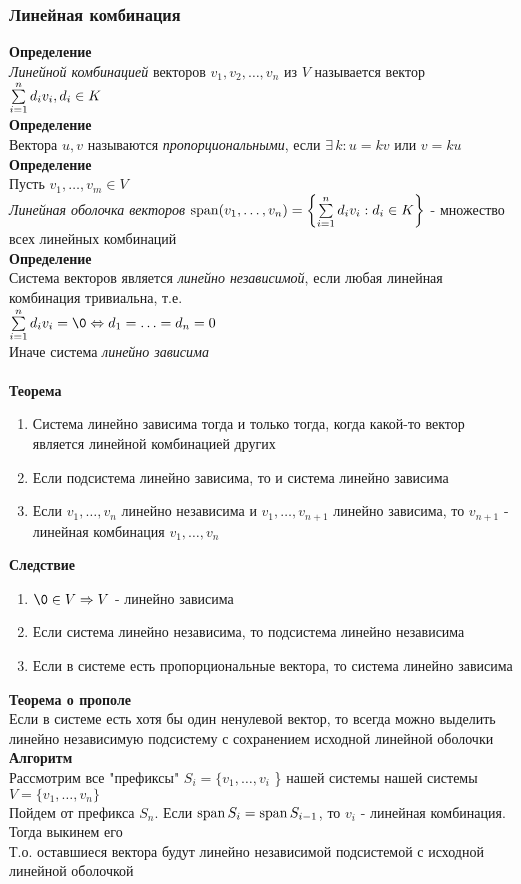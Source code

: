 \documentclass[12pt]{article}
\begin{document}
\subsubsection{Линейная комбинация}
\textbf{Определение}\\
\textit{Линейной комбинацией} векторов $v_1, v_2, \ldots, v_n$ из $V$ называется вектор $\sum\limits_{i=1}^n d_iv_i, d_i \in K$\\
\textbf{Определение}\\
Вектора $u,v$ называются \textit{пропорциональными}, если $\exists\,k: u = kv$ или $v = ku$\\
\textbf{Определение}\\
Пусть $v_1, \ldots, v_m \in V$\\
\textit{Линейная оболочка векторов} $\operatorname{span}(v_1,\ldots,v_n) = \left\{ \sum\limits_{i=1}^n d_iv_i: d_i \in K\right\}$ - множество всех линейных комбинаций\\
\textbf{Определение}\\
Система векторов является \textit{линейно независимой}, если любая линейная комбинация тривиальна, т.е.\\
$\suml_{i=1}^n d_iv_i = \0 \Leftrightarrow d_1 = \ldots = d_n = 0$\\
Иначе система \textit{линейно зависима}\\\\
\textbf{Теорема}
\begin{enumerate}
    \item Система линейно зависима тогда и только тогда, когда какой-то вектор является линейной комбинацией других
    \item Если подсистема линейно зависима, то и система линейно зависима
    \item Если $v_1,\ldots,v_n$ линейно независима и $v_1, \ldots, v_{n+1}$ линейно зависима, то $v_{n+1}$ - линейная комбинация $v_1,\ldots,v_n$
\end{enumerate}
\textbf{Следствие}
\begin{enumerate}
    \item $\0 \in V \Rightarrow V$ - линейно зависима
    \item Если система линейно независима, то подсистема линейно независима
    \item Если в системе есть пропорциональные вектора, то система линейно зависима
\end{enumerate}
\textbf{Теорема о прополе}\\
Если в системе есть хотя бы один ненулевой вектор, то всегда можно выделить линейно независимую подсистему с сохранением исходной линейной оболочки\\
\textbf{Алгоритм}\\
Рассмотрим все "префиксы" $S_i = \{ v_1, \ldots, v_i$ \} нашей системы нашей системы $V = \{ v_1, \ldots, v_n \}$\\
Пойдем от префикса $S_n$. Если $\operatorname{span} S_i = \operatorname{span} S_{i-1}$, то $v_i$ - линейная комбинация. Тогда выкинем его\\
Т.о. оставшиеся вектора будут линейно независимой подсистемой с исходной линейной оболочкой\\
\end{document}

